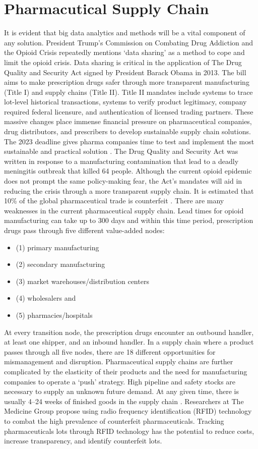 \documentclass[sigconf]{acmart}
\begin{document}
\section{Pharmacutical Supply Chain}
It is evident that big data analytics and methods will be a vital component of any solution. President Trump’s Commission on Combating Drug Addiction and the Opioid Crisis repeatedly mentions ‘data sharing’ as a method to cope and limit the opioid crisis\cite{opsis3}. Data sharing is critical in the application of The Drug Quality and Security Act signed by President Barack Obama in 2013. The bill aims to make prescription drugs safer through more transparent manufacturing (Title I) and supply chains (Title II). Title II mandates include systems to trace lot-level historical transactions, systems to verify product legitimacy, company required federal licensure, and authentication of licensed trading partners. These massive changes place immense financial pressure on pharmaceutical companies, drug distributors, and prescribers to develop sustainable supply chain solutions. The 2023 deadline gives pharma companies time to test and implement the most sustainable and practical solution \cite{opsis8}. The Drug Quality and Security Act was written in response to a manufacturing contamination that lead to a deadly meningitis outbreak that killed 64 people. Although the current opioid epidemic does not prompt the same policy-making fear, the Act’s mandates will aid in reducing the crisis through a more transparent supply chain. It is estimated that 10\% of the global pharmaceutical trade is counterfeit \cite{Kelesidis01}. There are many weaknesses in the current pharmaceutical supply chain. Lead times for opioid manufacturing can take up to 300 days and within this time period, prescription drugs pass through five different value-added nodes:
\begin{itemize}
\item (1) primary manufacturing
\item (2) secondary manufacturing
\item (3) market warehouses/distribution centers
\item (4) wholesalers and
\item (5) pharmacies/hospitals \cite{Shah01}
\end{itemize}

At every transition node, the prescription drugs encounter an outbound handler, at least one shipper, and an inbound handler. In a supply chain where a product passes through all five nodes, there are 18 different opportunities for mismanagement and disruption. Pharmaceutical supply chains are further complicated by the elasticity of their products and the need for manufacturing companies to operate a ‘push’ strategy. High pipeline and safety stocks are necessary to supply an unknown future demand. At any given time, there is usually 4–24 weeks of finished goods in the supply chain \cite{Shah01}. Researchers at The Medicine Group propose using radio frequency identification (RFID) technology to combat the high prevalence of counterfeit pharmaceuticals\cite{Taylor01}. Tracking pharmaceuticals lots through RFID technology has the potential to reduce costs, increase transparency, and identify counterfeit lots. 
\end{document}
